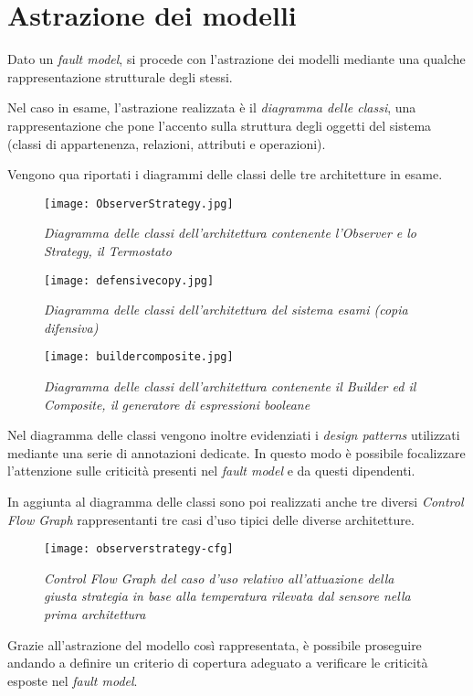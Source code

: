 \chapter{Astrazione dei modelli}

Dato un \emph{fault model}, si procede con l'astrazione dei modelli mediante una qualche rappresentazione strutturale degli stessi.

Nel caso in esame, l'astrazione realizzata è il \emph{diagramma delle classi}, una rappresentazione che pone l'accento sulla struttura degli oggetti del sistema (classi di appartenenza, relazioni, attributi e operazioni).

Vengono qua riportati i diagrammi delle classi delle tre architetture in esame.

\begin{figure}[h] 
  \centering
    \texttt{[image: ObserverStrategy.jpg]}
    \caption{{\small \textit{Diagramma delle classi dell'architettura contenente l'Observer e lo Strategy, il Termostato}}}
\end{figure}

\begin{figure}[h] 
  \centering
    \texttt{[image: defensivecopy.jpg]}
    \caption{{\small \textit{Diagramma delle classi dell'architettura del sistema esami (copia difensiva)}}}
\end{figure}

\begin{figure}[h] 
  \centering
    \texttt{[image: buildercomposite.jpg]}
    \caption{{\small \textit{Diagramma delle classi dell'architettura contenente il Builder ed il Composite, il generatore di espressioni booleane}}}
\end{figure}

Nel diagramma delle classi vengono inoltre evidenziati i \emph{design patterns} utilizzati mediante una serie di annotazioni dedicate. In questo modo è possibile focalizzare l'attenzione sulle criticità presenti nel \emph{fault model } e da questi dipendenti.

In aggiunta al diagramma delle classi sono poi realizzati anche tre diversi \emph{Control Flow Graph} rappresentanti tre casi d'uso tipici delle diverse architetture. 

\begin{figure}[h] 
  \centering
    \texttt{[image: observerstrategy-cfg]}
    \caption{{\small \textit{Control Flow Graph del caso d'uso relativo all'attuazione della giusta strategia in base alla temperatura rilevata dal sensore nella prima architettura}}}
\end{figure}

Grazie all'astrazione del modello così rappresentata, è possibile proseguire andando a definire un criterio di copertura adeguato a verificare le criticità esposte nel \emph{fault model}.

